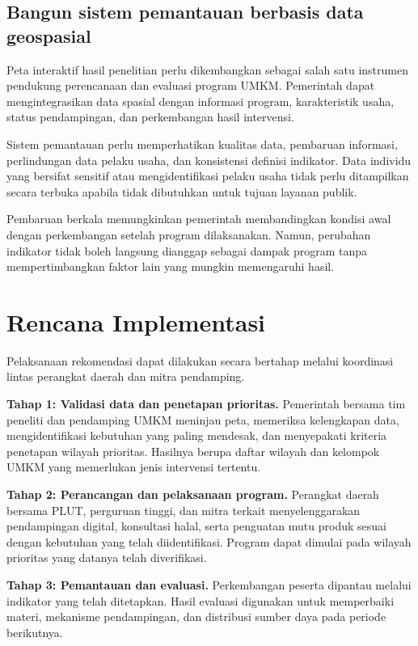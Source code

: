 \documentclass[
  indonesian,
  11pt,
  a4paper,
]{report}
\begin{document}
\section*{Bangun sistem pemantauan berbasis data
geospasial}\label{bangun-sistem-pemantauan-berbasis-data-geospasial}

Peta interaktif hasil penelitian perlu dikembangkan sebagai salah satu
instrumen pendukung perencanaan dan evaluasi program UMKM. Pemerintah
dapat mengintegrasikan data spasial dengan informasi program,
karakteristik usaha, status pendampingan, dan perkembangan hasil
intervensi.

Sistem pemantauan perlu memperhatikan kualitas data, pembaruan
informasi, perlindungan data pelaku usaha, dan konsistensi definisi
indikator. Data individu yang bersifat sensitif atau mengidentifikasi
pelaku usaha tidak perlu ditampilkan secara terbuka apabila tidak
dibutuhkan untuk tujuan layanan publik.

Pembaruan berkala memungkinkan pemerintah membandingkan kondisi awal
dengan perkembangan setelah program dilaksanakan. Namun, perubahan
indikator tidak boleh langsung dianggap sebagai dampak program tanpa
mempertimbangkan faktor lain yang mungkin memengaruhi hasil.

\chapter*{Rencana Implementasi}\label{rencana-implementasi}

Pelaksanaan rekomendasi dapat dilakukan secara bertahap melalui
koordinasi lintas perangkat daerah dan mitra pendamping.

\textbf{Tahap 1: Validasi data dan penetapan prioritas.} Pemerintah
bersama tim peneliti dan pendamping UMKM meninjau peta, memeriksa
kelengkapan data, mengidentifikasi kebutuhan yang paling mendesak, dan
menyepakati kriteria penetapan wilayah prioritas. Hasilnya berupa daftar
wilayah dan kelompok UMKM yang memerlukan jenis intervensi tertentu.

\textbf{Tahap 2: Perancangan dan pelaksanaan program.} Perangkat daerah
bersama PLUT, perguruan tinggi, dan mitra terkait menyelenggarakan
pendampingan digital, konsultasi halal, serta penguatan mutu produk
sesuai dengan kebutuhan yang telah diidentifikasi. Program dapat dimulai
pada wilayah prioritas yang datanya telah diverifikasi.

\textbf{Tahap 3: Pemantauan dan evaluasi.} Perkembangan peserta dipantau
melalui indikator yang telah ditetapkan. Hasil evaluasi digunakan untuk
memperbaiki materi, mekanisme pendampingan, dan distribusi sumber daya
pada periode berikutnya.
\end{document}
